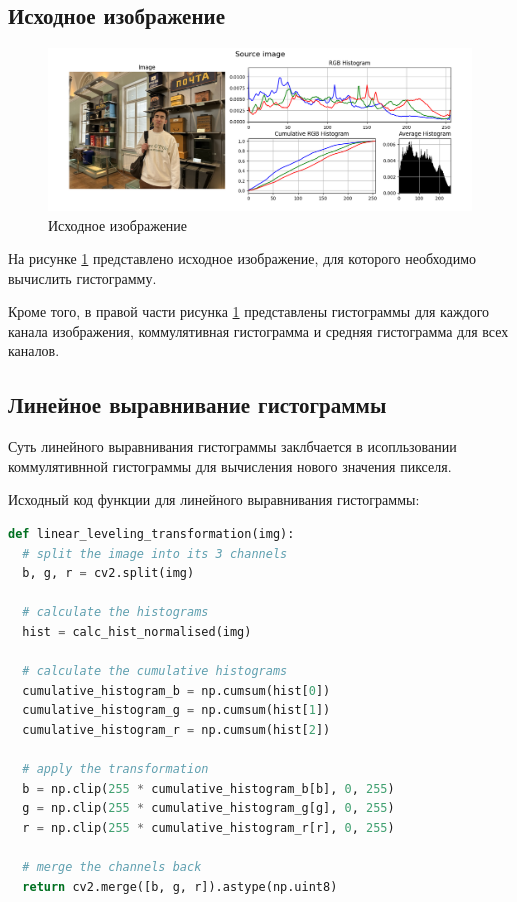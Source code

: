 \documentclass[a4paper, 12pt]{extarticle}
\begin{document}
\subsection{Исходное изображение}

\begin{figure}[h]
    \centering
    \includegraphics[width=\textwidth]{../results/Source image.png}
    \caption{Исходное изображение}
    \label{fig:source}
\end{figure}

На рисунке \ref{fig:source} представлено исходное изображение, для которого необходимо вычислить гистограмму.

Кроме того, в правой части рисунка \ref{fig:source} представлены гистограммы для каждого канала изображения, коммулятивная гистограмма и средняя гистограмма для всех каналов.

\subsection{Линейное выравнивание гистограммы}

Суть линейного выравнивания гистограммы заклбчается в исопльзовании коммулятивнной гистограммы для вычисления нового значения пикселя.

Исходный код функции для линейного выравнивания гистограммы:

\begin{lstlisting}[language=Python]
def linear_leveling_transformation(img):
  # split the image into its 3 channels
  b, g, r = cv2.split(img)

  # calculate the histograms
  hist = calc_hist_normalised(img)

  # calculate the cumulative histograms
  cumulative_histogram_b = np.cumsum(hist[0]) 
  cumulative_histogram_g = np.cumsum(hist[1])
  cumulative_histogram_r = np.cumsum(hist[2])

  # apply the transformation
  b = np.clip(255 * cumulative_histogram_b[b], 0, 255)
  g = np.clip(255 * cumulative_histogram_g[g], 0, 255)
  r = np.clip(255 * cumulative_histogram_r[r], 0, 255)

  # merge the channels back
  return cv2.merge([b, g, r]).astype(np.uint8)
\end{lstlisting}
\end{document}
